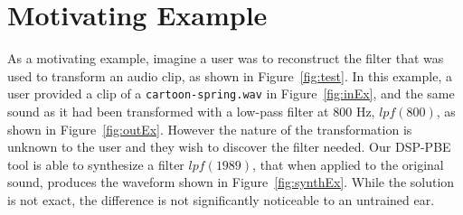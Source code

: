 \section{Motivating Example}

As a motivating example, imagine a user was to reconstruct the filter that was used to transform an audio clip, as shown in Figure~\ref{fig:test}.
In this example, a user provided a clip of a \texttt{cartoon-spring.wav} in Figure~\ref{fig:inEx}, and the same sound as it had been transformed with a low-pass filter at 800 Hz, $lpf(800)$, as shown in Figure~\ref{fig:outEx}.
However the nature of the transformation is unknown to the user and they wish to discover the filter needed.
Our DSP-PBE tool is able to synthesize a filter $lpf(1989)$, that when applied to the original sound, produces the waveform shown in Figure~\ref{fig:synthEx}.
While the solution is not exact, the difference is not significantly noticeable to an untrained ear.

